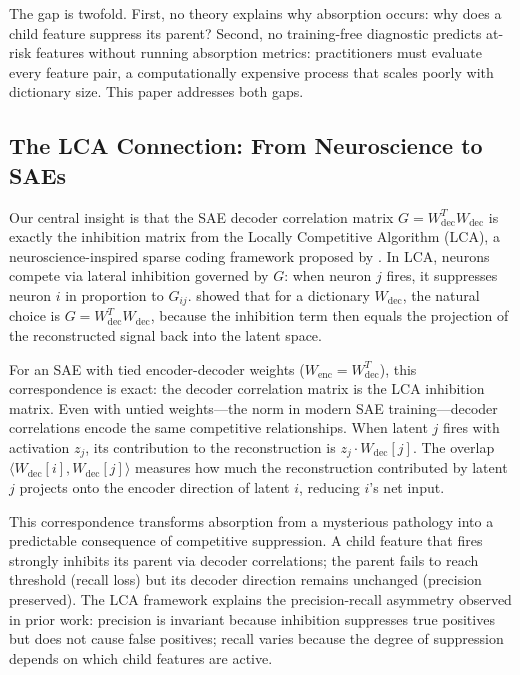 \documentclass{article}
\begin{document}
The gap is twofold. First, no theory explains why absorption occurs: why does a child feature suppress its parent? Second, no training-free diagnostic predicts at-risk features without running absorption metrics: practitioners must evaluate every feature pair, a computationally expensive process that scales poorly with dictionary size. This paper addresses both gaps.

\subsection{The LCA Connection: From Neuroscience to SAEs}

Our central insight is that the SAE decoder correlation matrix $G = W_{\text{dec}}^T W_{\text{dec}}$ is exactly the inhibition matrix from the Locally Competitive Algorithm (LCA), a neuroscience-inspired sparse coding framework proposed by \citet{rozell2008sparse}. In LCA, neurons compete via lateral inhibition governed by $G$: when neuron $j$ fires, it suppresses neuron $i$ in proportion to $G_{ij}$. \citet{rozell2008sparse} showed that for a dictionary $W_{\text{dec}}$, the natural choice is $G = W_{\text{dec}}^T W_{\text{dec}}$, because the inhibition term then equals the projection of the reconstructed signal back into the latent space.

For an SAE with tied encoder-decoder weights ($W_{\text{enc}} = W_{\text{dec}}^T$), this correspondence is exact: the decoder correlation matrix is the LCA inhibition matrix. Even with untied weights---the norm in modern SAE training---decoder correlations encode the same competitive relationships. When latent $j$ fires with activation $z_j$, its contribution to the reconstruction is $z_j \cdot W_{\text{dec}}[j]$. The overlap $\langle W_{\text{dec}}[i], W_{\text{dec}}[j] \rangle$ measures how much the reconstruction contributed by latent $j$ projects onto the encoder direction of latent $i$, reducing $i$'s net input.

This correspondence transforms absorption from a mysterious pathology into a predictable consequence of competitive suppression. A child feature that fires strongly inhibits its parent via decoder correlations; the parent fails to reach threshold (recall loss) but its decoder direction remains unchanged (precision preserved). The LCA framework explains the precision-recall asymmetry observed in prior work: precision is invariant because inhibition suppresses true positives but does not cause false positives; recall varies because the degree of suppression depends on which child features are active.
\end{document}
